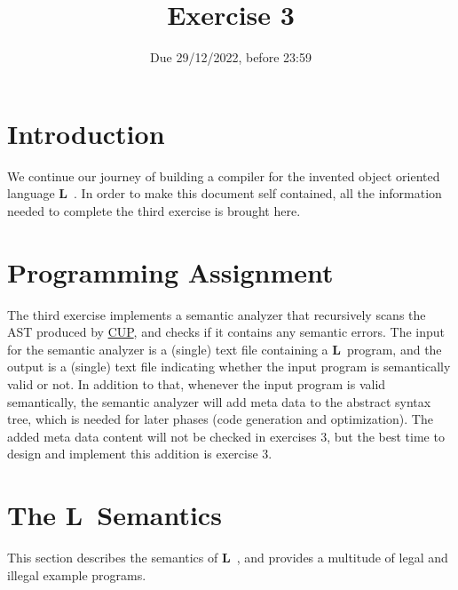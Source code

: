 \documentclass{article}
\begin{document}
\title{Exercise 3}


\date{Due 29/12/2022, before 23:59}

\maketitle

\newcommand{\plname}{\textbf{L}\ }

\section{Introduction}
We continue our journey of building a compiler
for the invented object oriented language \plname.
In order to make this document self contained,
all the information needed to complete the third exercise is brought here.

\section{Programming Assignment}
The third exercise implements a semantic analyzer that
recursively scans the AST produced by
\href{http://www2.cs.tum.edu/projects/cup/}{CUP},
and checks if it contains any semantic errors.
The input for the semantic analyzer is a (single) text file containing a \plname program,
and the output is a (single) text file indicating whether the input program
is semantically valid or not.
In addition to that, whenever the input program is valid semantically,
the semantic analyzer will add meta data to the abstract syntax tree,
which is needed for later phases (code generation and optimization).
The added meta data content will not be checked in exercises $3$,
but the best time to design and implement this addition is
exercise $3$.

\section{The \plname Semantics}
This section describes the semantics of \plname,
and provides a multitude of legal and illegal example programs.
\end{document}
